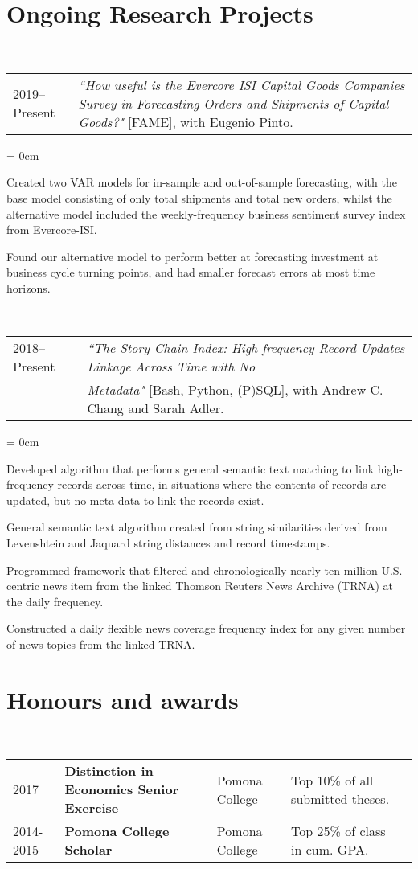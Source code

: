 \documentclass[a4paper, 11pt]{article}
\begin{document}
  \section{Ongoing Research Projects}
    ~\begin{tabular}{lP{15cm}}
      2019--Present & \textit{``How useful is the Evercore ISI Capital Goods Companies Survey in Forecasting Orders and Shipments of Capital Goods?"} {[FAME]}, with Eugenio Pinto.
    \end{tabular}
    \begin{compactitem}\parskip = 0cm
      \item Created two VAR models for in-sample and out-of-sample forecasting, with the base model consisting of only total shipments and total new orders, whilst the alternative model included the weekly-frequency business sentiment survey index from Evercore-ISI.
      \item Found our alternative model to perform better at forecasting investment at business cycle turning points, and had smaller forecast errors at most time horizons.
    \end{compactitem}
    \vspace*{1em}
    ~\begin{tabular}{lP{15cm}}
      2018--Present & \textit{``The Story Chain Index: High-frequency Record Updates Linkage Across Time with No}\\
      & \textit{Metadata"} {[Bash, Python, (P)SQL]}, with Andrew C. Chang and Sarah Adler.
    \end{tabular}
    \begin{compactitem}\parskip = 0cm
      \item Developed algorithm that performs general semantic text matching to link high-frequency records across time, in situations where the contents of records are updated, but no meta data to link the records exist.
      \item General semantic text algorithm created from string similarities derived from Levenshtein and Jaquard string distances and record timestamps.
      \item Programmed framework that filtered and chronologically nearly ten million U.S.-centric news item from the linked Thomson Reuters News Archive (TRNA) at the daily frequency.
      \item Constructed a daily flexible news coverage frequency index for any given number of news topics from the linked TRNA.
    \end{compactitem}
  \section{Honours and awards}
    ~\begin{tabular}{llllP{1cm}}
      2017 & \textbf{Distinction in Economics Senior Exercise} & Pomona College & Top 10\% of all submitted theses.\\
      2014-2015 & \textbf{Pomona College Scholar} & Pomona College & Top 25\% of class in cum. GPA.\\
    \end{tabular}
\end{document}
